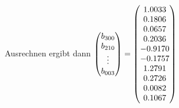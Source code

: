 Ausrechnen ergibt dann
$\left( \begin{matrix}b_{300} \\ b_{210} \\ \vdots \\ b_{003}\end{matrix}\right) =
\left( \begin{matrix}
 1.0033\\
 0.1806\\
 0.0657\\
 0.2036\\
-0.9170\\
-0.1757\\
 1.2791\\
 0.2726\\
 0.0082\\
 0.1067\end{matrix}\right)$

